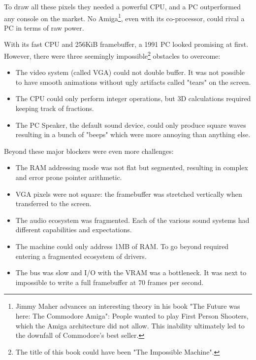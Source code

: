 \par
To draw all these pixels they needed a powerful CPU, and a PC outperformed any console on the market. No Amiga\footnote{Jimmy Maher advances an interesting theory in his book "The Future was here: The Commodore Amiga": People wanted to play First Person Shooters, which the Amiga architecture did not allow. This inability ultimately led to the downfall of Commodore's best seller.}, even with its co-processor, could rival a PC in terms of raw power.
\par


 
With its fast CPU and 256KiB framebuffer, a 1991 PC looked promising at first. However, there were three seemingly impossible\footnote{The title of this book could have been "The Impossible Machine".} obstacles to overcome:
\begin{itemize}
\item The video system (called VGA) could not double buffer. It was not possible to have smooth animations without ugly artifacts called "tears" on the screen.
\item The CPU could only perform integer operations, but 3D calculations required keeping track of fractions.
\item The PC Speaker, the default sound device, could only produce square waves resulting in a bunch of "beeps" which were more annoying than anything else.
\end{itemize}
Beyond these major blockers were even more challenges:
\begin{itemize}
\item The RAM addressing mode was not flat but segmented, resulting in complex and error prone pointer arithmetic.
\item VGA pixels were not square: the framebuffer was stretched vertically when
transferred to the screen.
\item The audio ecosystem was fragmented. Each of the various sound systems had different capabilities and expectations.
\item The machine could only address 1MB of RAM. To go beyond required entering a fragmented ecosystem of drivers.
\item The bus was slow and I/O with the VRAM was a bottleneck. It was next to impossible to write a full framebuffer at 70 frames per second.
\end{itemize}

